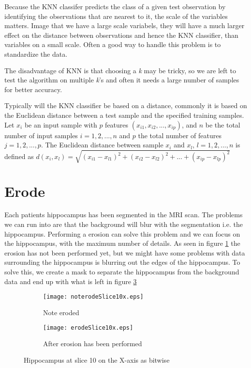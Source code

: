Because the KNN classifer predicts the class of a given test observation by identifying the observations that are nearest to it, the scale of the variables matters. Image that we have a large scale variabels, they will have a much larger effect on the distance between observations and hence the KNN classifier, than variables on a small scale. Often a good way to handle this problem is to standardize the data.

The disadvantage of KNN is that choosing a \textit{k} may be tricky, so we are left to test the algorithm on multiple \textit{k}'s and often it needs a large number of samples for better accuracy.

Typically will the KNN classifier be based on a distance, commonly it is based on the Euclidean distance between a test sample and the specified training samples. Let $x_i$ be an input sample with $p$ features $(x_{i1}, x_{i2},...,x_{ip})$, and $n$ be the total number of input samples $i=1,2,...,n$ and $p$ the total number of features $j=1,2,...,p$. The Euclidean distance between sample $x_i$ and $x_l$, $l=1,2,...,n$ is defined as $d(x_i,x_l) = \sqrt{(x_{i1}-x_{l1})^2+(x_{i2}-x_{l2})^2+...+(x_{ip}-x_{lp})^2}$

\section{Erode}

Each patients hippocampus has been segmented in the MRI scan. The problems we can run into are that the background will blur with the segmentation i.e. the hippocampus. Performing a erosion can solve this problem and we can focus on the hippocampus, with the maximum number of details. As seen in figure \ref{fig:noterodeslice} the erosion has not been performed yet, but we might have some problems with data surrounding the hippocampus is blurring out the edges of the hippocampus. To solve this, we create a mask to separate the hippocampus from the background data and end up with what is left in figure \ref{fig:erodeslice}

\begin{figure}[H]
    \begin{subfigure}{.5\textwidth}
      \centering
      \texttt{[image: noterodeSlice10x.eps]}
      \caption{Note eroded}\label{fig:noterodeslice}
    \end{subfigure}
    \begin{subfigure}{.5\textwidth}
      \centering
      \texttt{[image: erodeSlice10x.eps]}
      \caption{After erosion has been performed}\label{fig:erodeslice}
    \end{subfigure}
    \caption{Hippocampus at slice 10 on the X-axis as bitwise}
\end{figure}

